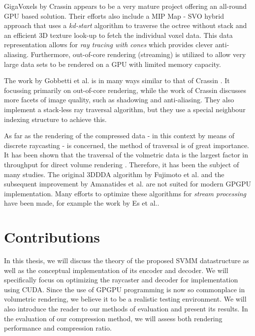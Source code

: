 GigaVoxels by Crassin \cite{crassin11} appears to be a very mature project offering an all-round GPU based solution. Their efforts also include a MIP Map - SVO hybrid approach that uses a \emph{kd-start} algorithm to traverse the octree without stack and an efficient 3D texture look-up to fetch the individual voxel data. This data representation allows for \emph{ray tracing with cones}\cite{amanatides84} which provides clever anti-aliasing. Furthermore, out-of-core rendering (streaming) is utilized to allow very large data sets to be rendered on a GPU with limited memory capacity.

The work by Gobbetti et al. \cite{gobbetti08} is in many ways similar to that of Crassin \cite{crassin11}. It focussing primarily on out-of-core rendering, while the work of Crassin \cite{crassin11} discusses more facets of image quality, such as shadowing and anti-aliasing. They also implement a stack-less ray traversal algorithm, but they use a special neighbour indexing structure to achieve this. 

As far as the rendering of the compressed data - in this context by means of discrete raycasting - is concerned, the method of traversal is of great importance. It has been shown that the traversal of the volmetric data is the largest factor in throughput for direct volume rendering \cite{levoy90}. Therefore, it has been the subject of many studies. The original 3DDDA algorithm by Fujimoto et al. \cite{fujimoto85} and the subsequent improvement by Amanatides et al. \cite{amanatideswoo87} are not suited for modern GPGPU implementation. Many efforts to optimize these algorithms for \emph{stream processing} have been made, for example the work by Es et al.\cite{acceleratedgrid07}.
%
\section{Contributions}
%
In this thesis, we will discuss the theory of the proposed SVMM datastructure as well as the conceptual implementation of its encoder and decoder. We will specifically focus on optimizing the raycaster and decoder for implementation using CUDA. Since the use of GPGPU programming is now so commonplace in volumetric rendering, we believe it to be a realistic testing environment. We will also introduce the reader to our methods of evaluation and present its results. In the evaluation of our compression method, we will assess both rendering performance and compression ratio. 

